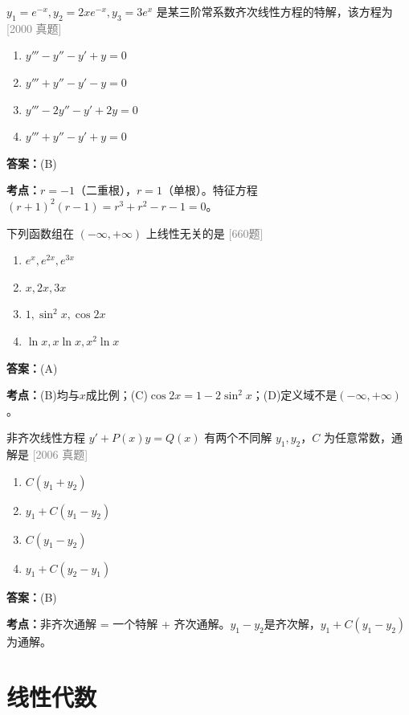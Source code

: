 \documentclass[12pt,a4paper]{ctexbook}
\newcommand{\src}[1]{\hfill\textcolor{gray}{\small\textsf{[#1]}}}
\newcommand{\ans}[1]{\begin{answerbox}\textbf{答案：}#1\end{answerbox}}
\newcommand{\kpt}[1]{\textbf{考点：}#1}
\begin{document}
\bigskip

\begin{exercise}
$y_1=e^{-x},y_2=2xe^{-x},y_3=3e^{x}$ 是某三阶常系数齐次线性方程的特解，该方程为 \hfill\src{2000 真题}
\begin{enumerate}[label=(\Alph*),nosep]
  \item $y'''-y''-y'+y=0$
  \item $y'''+y''-y'-y=0$
  \item $y'''-2y''-y'+2y=0$
  \item $y'''+y''-y'+y=0$
\end{enumerate}
\end{exercise}
\ans{(B)}
\kpt{$r=-1$（二重根），$r=1$（单根）。特征方程$(r+1)^2(r-1)=r^3+r^2-r-1=0$。}

\bigskip

\begin{exercise}[660题·解的线性无关性]
下列函数组在 $(-\infty,+\infty)$ 上线性无关的是 \hfill\src{660题}
\begin{enumerate}[label=(\Alph*),nosep]
  \item $e^{x},e^{2x},e^{3x}$
  \item $x,2x,3x$
  \item $1,\sin^2 x,\cos 2x$
  \item $\ln x,x\ln x,x^2\ln x$
\end{enumerate}
\end{exercise}
\ans{(A)}
\kpt{(B)均与$x$成比例；(C)$\cos2x=1-2\sin^2x$；(D)定义域不是$(-\infty,+\infty)$。}

\bigskip

\begin{exercise}
非齐次线性方程 $y'+P(x)y=Q(x)$ 有两个不同解 $y_1,y_2$，$C$ 为任意常数，通解是 \hfill\src{2006 真题}
\begin{enumerate}[label=(\Alph*),nosep]
  \item $C(y_1+y_2)$
  \item $y_1+C(y_1-y_2)$
  \item $C(y_1-y_2)$
  \item $y_1+C(y_2-y_1)$
\end{enumerate}
\end{exercise}
\ans{(B)}
\kpt{非齐次通解 = 一个特解 + 齐次通解。$y_1-y_2$是齐次解，$y_1+C(y_1-y_2)$为通解。}

\newpage

\chapter{线性代数}
\end{document}
